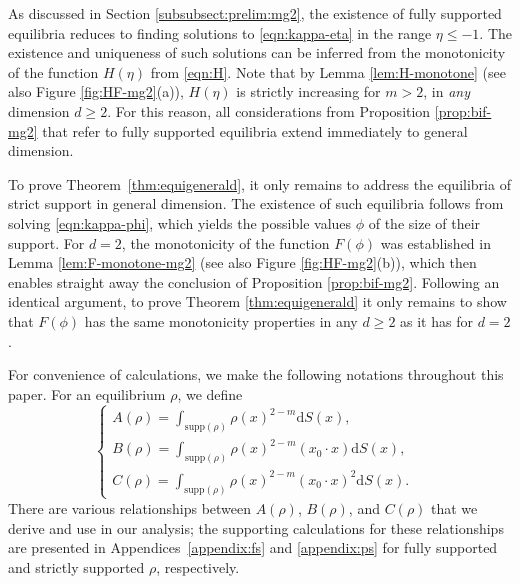 \documentclass[11pt]{amsart}
\newcommand{\dx}{\mathrm{d}S (x)}
\newcommand{\supp}{\mathrm{supp}(\rho)}
\newcommand{\dm}{d} %
\begin{document}
As discussed in Section \ref{subsubsect:prelim:mg2}, the existence of fully supported equilibria reduces to finding solutions to \eqref{eqn:kappa-eta} in the range $\eta \leq -1$. The existence and uniqueness of such solutions  can be inferred from the monotonicity of the function $H(\eta)$ from \eqref{eqn:H}. Note that by Lemma \ref{lem:H-monotone} (see also Figure \ref{fig:HF-mg2}(a)), $H(\eta)$ is strictly increasing for $m>2$, in {\em any} dimension $\dm \geq 2$. For this reason, all considerations from Proposition \ref{prop:bif-mg2} that refer to fully supported equilibria extend immediately to general dimension.

To prove Theorem~\ref{thm:equigenerald}, it only remains to address the  equilibria of strict support in general dimension. The existence of such equilibria follows from solving \eqref{eqn:kappa-phi}, which yields the possible values $\phi$ of the size of their support. For $\dm=2$, the monotonicity of the function $F(\phi)$ was established in Lemma \ref{lem:F-monotone-mg2} (see also Figure \ref{fig:HF-mg2}(b)), which then enables straight away the conclusion of Proposition \ref{prop:bif-mg2}. Following an identical argument, to prove Theorem \ref{thm:equigenerald} it only remains to show that $F(\phi)$ has the same monotonicity properties in any $\dm \geq 2$ as it has for $\dm=2$. 

For convenience of calculations, we make the following notations throughout this paper. For an equilibrium $\rho$, we define
\begin{equation}
\label{eqn:ABC}
\begin{cases}
\displaystyle A(\rho)=\int_{\supp}\rho(x)^{2-m}\dx,\quad \\[2pt]
\displaystyle B(\rho)=\int_{\supp}\rho(x)^{2-m}(x_0\cdot x)\dx,\quad \\[2pt]
\displaystyle C(\rho)=\int_{\supp}\rho(x)^{2-m}(x_0\cdot x)^2\dx.
\end{cases}
\end{equation}
There are various relationships between $A(\rho)$, $B(\rho)$, and $C(\rho)$ that we derive and use in our analysis; the supporting calculations for these relationships are presented in Appendices~\ref{appendix:fs} and \ref{appendix:ps} for fully supported and strictly supported $\rho$, respectively. 
\end{document}
